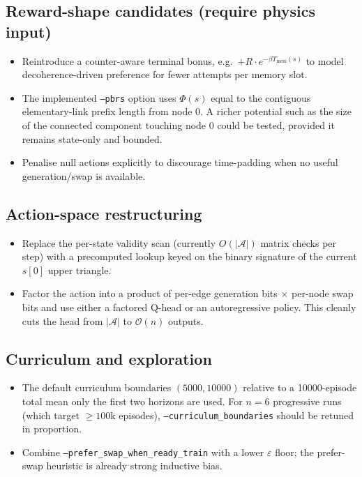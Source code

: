 \documentclass[11pt]{article}
\newcommand{\code}[1]{\texttt{#1}}
\begin{document}
\subsection{Reward-shape candidates (require physics input)}
\begin{itemize}
  \item Reintroduce a counter-aware terminal bonus, e.g.\ $+R\cdot e^{-\beta T_{\text{mem}}(s)}$ to model decoherence-driven preference for fewer attempts per memory slot.
  \item The implemented \code{--pbrs} option uses $\Phi(s)$ equal to the contiguous elementary-link prefix length from node 0. A richer potential such as the size of the connected component touching node 0 could be tested, provided it remains state-only and bounded.
  \item Penalise null actions explicitly to discourage time-padding when no useful generation/swap is available.
\end{itemize}

\subsection{Action-space restructuring}
\begin{itemize}
  \item Replace the per-state validity scan (currently $O(|\mathcal{A}|)$ matrix checks per step) with a precomputed lookup keyed on the binary signature of the current $s[0]$ upper triangle.
  \item Factor the action into a product of per-edge generation bits $\times$ per-node swap bits and use either a factored Q-head or an autoregressive policy. This cleanly cuts the head from $|\mathcal{A}|$ to $\mathcal{O}(n)$ outputs.
\end{itemize}

\subsection{Curriculum and exploration}
\begin{itemize}
  \item The default curriculum boundaries $(5000, 10000)$ relative to a 10000-episode total mean only the first two horizons are used. For $n=6$ progressive runs (which target $\geq 100$k episodes), \code{--curriculum\_boundaries} should be retuned in proportion.
  \item Combine \code{--prefer\_swap\_when\_ready\_train} with a lower $\varepsilon$ floor; the prefer-swap heuristic is already strong inductive bias.
\end{itemize}
\end{document}

